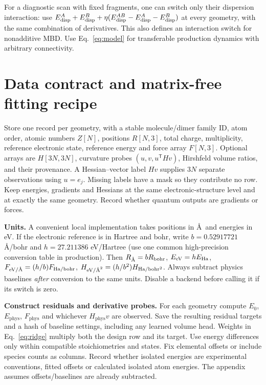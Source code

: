 \documentclass[11pt,a4paper]{article}
\newcommand{\T}{\mathsf T}\newcommand{\tr}{\operatorname{tr}}
\newcommand{\phys}{\mathrm{phys}}\newcommand{\refm}{\mathrm{ref}}
\begin{document}
For a diagnostic scan with fixed fragments, one can switch only their dispersion interaction: use $E^{A}_{\rm disp}+E^{B}_{\rm disp}+\eta(E^{AB}_{\rm disp}-E^{A}_{\rm disp}-E^{B}_{\rm disp})$ at every geometry, with the same combination of derivatives. This also defines an interaction switch for nonadditive MBD. Use Eq.~\eqref{eq:model} for transferable production dynamics with arbitrary connectivity.
\pg\section{Data contract and matrix-free fitting recipe}\label{sec:data}
Store one record per geometry, with a stable molecule/dimer family ID, atom order, atomic numbers $Z[N]$, positions $R[N,3]$, total charge, multiplicity, reference electronic state, reference energy and force array $F[N,3]$. Optional arrays are $H[3N,3N]$, curvature probes $(u,v,u^\T H v)$, Hirshfeld volume ratios, and their provenance. A Hessian--vector label $Hv$ supplies $3N$ separate observations using $u=e_j$. Missing labels have a mask so they contribute no row. Keep energies, gradients and Hessians at the same electronic-structure level and at exactly the same geometry. Record whether quantum outputs are gradients or forces.

\textbf{Units.} A convenient local implementation takes positions in \AA\ and energies in eV. If the electronic reference is in Hartree and bohr, write $b=0.52917721$ \AA/bohr and $h=27.211386$ eV/Hartree (use one common high-precision conversion table in production). Then $R_{\text{\AA}}=bR_{\rm bohr}$, $E_{\rm eV}=hE_{\rm Ha}$, $F_{\rm eV/\text{\AA}}=(h/b)F_{\rm Ha/bohr}$, $H_{\rm eV/\text{\AA}^2}=(h/b^2)H_{\rm Ha/bohr^2}$. Always subtract physics baselines \emph{after} conversion to the same units. Disable a backend before calling it if its switch is zero.

\textbf{Construct residuals and derivative probes.} For each geometry compute $E_0$, $E_{\phys}$, $F_{\phys}$ and whichever $H_{\phys}v$ are observed. Save the resulting residual targets and a hash of baseline settings, including any learned volume head. Weights in Eq.~\eqref{eq:ridge} multiply both the design row and its target. Use energy differences only within compatible stoichiometries and states. Fix elemental offsets or include species counts as columns. Record whether isolated energies are experimental conventions, fitted offsets or calculated isolated atom energies. The appendix assumes offsets/baselines are already subtracted.
\end{document}
